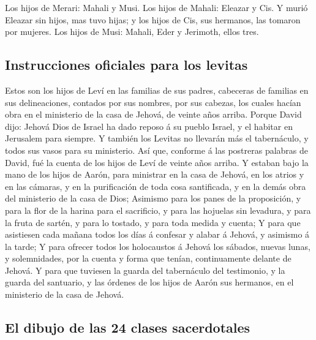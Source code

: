  Los hijos de Merari: Mahali y Musi. Los hijos de Mahali:
Eleazar y Cis.  Y murió Eleazar sin hijos, mas tuvo hijas;
y los hijos de Cis, sus hermanos, las tomaron por mujeres. 
Los hijos de Musi: Mahali, Eder y Jerimoth, ellos tres.

\hypertarget{instrucciones-oficiales-para-los-levitas}{%
\subsection{Instrucciones oficiales para los
levitas}\label{instrucciones-oficiales-para-los-levitas}}

 Estos son los hijos de Leví en las familias de sus padres,
cabeceras de familias en sus delineaciones, contados por sus nombres,
por sus cabezas, los cuales hacían obra en el ministerio de la casa de
Jehová, de veinte años arriba.  Porque David dijo: Jehová
Dios de Israel ha dado reposo á su pueblo Israel, y el habitar en
Jerusalem para siempre.  Y también los Levitas no llevarán
más el tabernáculo, y todos sus vasos para su ministerio. 
Así que, conforme á las postreras palabras de David, fué la cuenta de
los hijos de Leví de veinte años arriba.  Y estaban bajo la
mano de los hijos de Aarón, para ministrar en la casa de Jehová, en los
atrios y en las cámaras, y en la purificación de toda cosa santificada,
y en la demás obra del ministerio de la casa de Dios; 
Asimismo para los panes de la proposición, y para la flor de la harina
para el sacrificio, y para las hojuelas sin levadura, y para la fruta de
sartén, y para lo tostado, y para toda medida y cuenta;  Y
para que asistiesen cada mañana todos los días á confesar y alabar á
Jehová, y asimismo á la tarde;  Y para ofrecer todos los
holocaustos á Jehová los sábados, nuevas lunas, y solemnidades, por la
cuenta y forma que tenían, continuamente delante de Jehová.
 Y para que tuviesen la guarda del tabernáculo del
testimonio, y la guarda del santuario, y las órdenes de los hijos de
Aarón sus hermanos, en el ministerio de la casa de Jehová.

\hypertarget{el-dibujo-de-las-24-clases-sacerdotales}{%
\subsection{El dibujo de las 24 clases
sacerdotales}\label{el-dibujo-de-las-24-clases-sacerdotales}}

